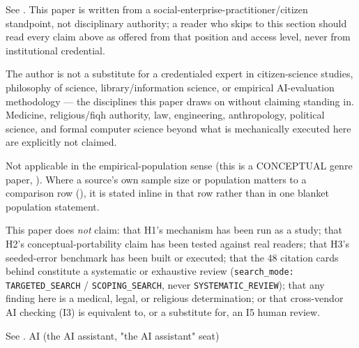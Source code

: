 
\begin{disclaimers}
  \item[D-STANDPOINT] See . This paper is written from a
    social-enterprise-practitioner/citizen standpoint, not disciplinary
    authority; a reader who skips to this section should read every claim
    above as offered from that position and access level, never from
    institutional credential.
  \item[D-NONEXPERT] The author is not a substitute for a credentialed expert
    in citizen-science studies, philosophy of science, library/information
    science, or empirical AI-evaluation methodology --- the disciplines this
    paper draws on without claiming standing in. Medicine, religious/fiqh
    authority, law, engineering, anthropology, political science, and formal
    computer science beyond what is mechanically executed here are explicitly
    not claimed.
  \item[D-SCOPE] Not applicable in the empirical-population sense (this is a
    \textsc{CONCEPTUAL} genre paper, ). Where a source's own
    sample size or population matters to a comparison row
    (), it is stated inline in that
    row rather than in one blanket population statement.
  \item[D-NONCLAIM] This paper does \emph{not} claim: that H1's mechanism has
    been run as a study; that H2's conceptual-portability claim has been
    tested against real readers; that H3's seeded-error benchmark has been
    built or executed; that the 48 citation cards behind
     constitute a systematic or
    exhaustive review (\texttt{search\_mode: TARGETED\_SEARCH} /
    \texttt{SCOPING\_SEARCH}, never \texttt{SYSTEMATIC\_REVIEW}); that any
    finding here is a medical, legal, or religious determination; or that
    cross-vendor AI checking (I3) is equivalent to, or a substitute for, an
    I5 human review.
  \item[D-AIFILL] See . AI (the AI assistant, "the AI assistant" seat)

\end{disclaimers}
